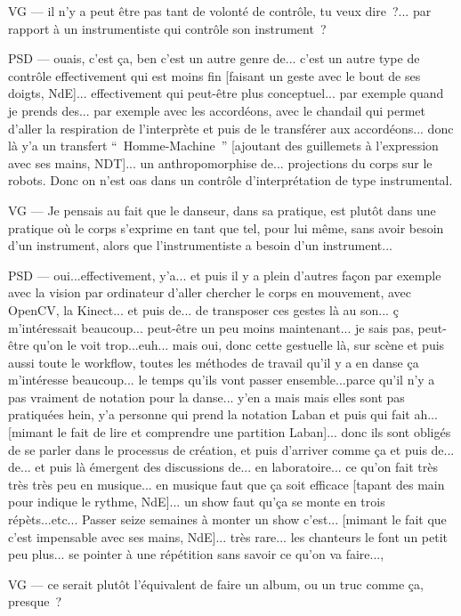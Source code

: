 VG — il n'y a peut être pas tant de volonté de contrôle, tu veux dire ?... par rapport à un instrumentiste qui contrôle son instrument ?

PSD — ouais, c'est ça, ben c'est un autre genre de... c'est un autre type de contrôle effectivement qui est moins fin [faisant un geste avec le bout de ses doigts, NdE]... effectivement qui peut-être plus conceptuel... par exemple quand je prends des... par exemple avec les accordéons, avec le chandail qui permet d'aller la respiration de l'interprète et puis de le transférer aux accordéons... donc là y'a un transfert “ Homme-Machine ” [ajoutant des guillemets à l'expression avec ses mains, NDT]... un anthropomorphise de... projections du corps sur le robots. Donc on n'est oas dans un contrôle d'interprétation de type instrumental.

VG — Je pensais au fait que le danseur, dans sa pratique, est plutôt dans une pratique où le corps s'exprime en tant que tel, pour lui même, sans avoir besoin d'un instrument, alors que l'instrumentiste a besoin d'un instrument...

PSD — oui...effectivement, y'a... et puis il y a plein d'autres façon par exemple avec la vision par ordinateur d'aller chercher le corps en mouvement, avec OpenCV, la Kinect... et puis de... de transposer ces gestes là au son... ç m'intéressait beaucoup... peut-être un peu moins maintenant... je sais pas, peut-être qu'on le voit trop...euh... mais oui, donc cette gestuelle là, sur scène et puis aussi toute le workflow, toutes les méthodes de travail qu'il y a en danse ça m'intéresse beaucoup... le temps qu'ils vont passer ensemble...parce qu'il n'y a pas vraiment de notation pour la danse... y'en a mais mais elles sont pas pratiquées hein, y'a personne qui prend la notation Laban et puis qui fait ah... [mimant le fait de lire et comprendre une partition Laban]... donc ils sont obligés de se parler dans le processus de création, et puis d'arriver comme ça et puis de... de... et puis là émergent des discussions de... en laboratoire... ce qu'on fait très très très peu en musique... en musique faut que ça soit efficace [tapant des main pour indique le rythme,  NdE]... un show faut qu'ça se monte en trois répèts...etc... Passer seize semaines à monter un show c'est... [mimant le fait que c'est impensable avec ses mains,  NdE]... très rare... les chanteurs le font un petit peu plus... se pointer à une répétition sans savoir ce qu'on va faire..., 


VG — ce serait plutôt l'équivalent de faire un album, ou un truc comme ça, presque ?

